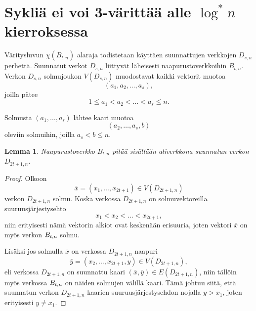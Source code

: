 \documentclass[finnish]{tktltiki2}
\newtheorem{lem}[lau]{Lemma}
\theoremstyle{definition}
\theoremstyle{remark}
\newcommand{\Dsn}{D_{s,n}}
\begin{document}
\section{Sykliä ei voi 3-värittää alle $\log^* n$ kierroksessa}

Väritysluvun $\chi(B_{t,n})$ alaraja todistetaan käyttäen suunnattujen
verkkojen $\Dsn$ perhettä. Suunnatut verkot $\Dsn$ liittyvät läheisesti
naapurustoverkkoihin $B_{t,n}$. Verkon $\Dsn$ solmujoukon $V(\Dsn)$ muodostavat
kaikki vektorit muotoa
%
\begin{equation*}
    (a_1,a_2,\dots,a_s),
\end{equation*}
%
joilla pätee
%
\begin{equation*}
    1 \leq a_1 < a_2 < \dots < a_s \leq n.
\end{equation*}

Solmusta $(a_1,\dots,a_s)$ lähtee kaari muotoa
%
\begin{equation*}
    (a_2,\dots,a_s,b)
\end{equation*}
%
oleviin solmuihin, joilla $a_s < b \leq n$.

\begin{lem}
    Naapurustoverkko $B_{t,n}$ pitää sisällään aliverkkona suunnatun verkon
    $D_{2t+1,n}$.
\end{lem}

\newcommand{\D}{D_{2t+1,n}}
\begin{proof}
    Olkoon
    \begin{equation*}
        \bar{x} = (x_1, \dots, x_{2t+1}) \in V(\D)
    \end{equation*}
    verkon $\D$ solmu.  Koska verkossa $\D$ on solmuvektoreilla
    suu\-ruus\-jär\-jes\-tys\-eh\-to
    \begin{equation*}
        x_1 < x_2 < \dots < x_{2t+1},
    \end{equation*}
    niin erityisesti nämä vektorin alkiot ovat keskenään erisuuria, joten
    vektori $\bar{x}$ on myös verkon $B_{t,n}$ solmu.

    Lisäksi jos solmulla $\bar{x}$ on verkossa $\D$ naapuri
    \begin{equation*}
            \bar{y} = (x_2, \dots, x_{2t+1}, y) \in V(\D),
    \end{equation*}
    eli verkossa $\D$ on suunnattu kaari $(\bar{x},\bar{y}) \in E(\D)$, niin
    tällöin myös verkossa $B_{t,n}$ on näiden solmujen välillä kaari. Tämä
    johtuu siitä, että suunnatun verkon $\D$ kaarien suuruusjärjestysehdon
    nojalla $y > x_1$, joten erityisesti $y \neq x_1$.
\end{proof}
\end{document}
